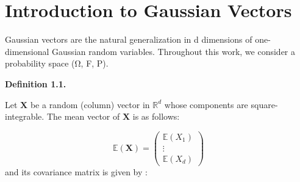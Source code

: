 \documentclass[12pt]{article}
\begin{document}
\newpage

\section{Introduction to Gaussian Vectors}

Gaussian vectors are the natural generalization in d dimensions of one-dimensional Gaussian random variables. Throughout this work, we consider a probability space (Ω, F, P).

\vspace{0,3cm}

\textbf{Definition 1.1.}


Let $\mathbf{X}$ be a random (column) vector in $\mathbb{R}^d$ whose components are square-integrable. The mean vector of $\mathbf{X}$ is as follows:

\[
\mathbb{E}(\mathbf{X}) =
\begin{pmatrix}
\mathbb{E}(X_1) \\
\vdots \\
\mathbb{E}(X_d)
\end{pmatrix}
\]
and its covariance matrix is given by :
\end{document}
